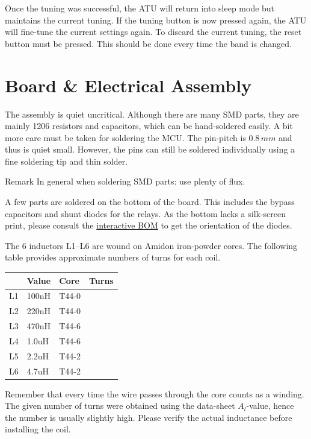 \documentclass[10pt, a4paper,twoside]{scrartcl}
\newenvironment{remark}{\begin{bclogo}[couleur=blue!30,arrondi=.1,logo=\bcinfo,ombre=true]{Remark}}{\end{bclogo}}
\begin{document}
Once the tuning was successful, the ATU will return into sleep mode but maintains the current tuning. If the tuning button is now pressed again, the ATU will fine-tune the current settings again. To discard the current tuning, the reset button must be pressed. This should be done every time the band is changed.

\section{Board \& Electrical Assembly}
The assembly is quiet uncritical. Although there are many SMD parts, they are mainly 1206 resistors and capacitors, which can be hand-soldered easily. A bit more care must be taken for soldering the MCU. The pin-pitch is $0.8\,mm$ and thus is quiet small. However, the pins can still be soldered individually using a fine soldering tip and thin solder. 

\begin{remark}
In general when soldering SMD parts: use plenty of flux. 
\end{remark}

A few parts are soldered on the bottom of the board. This includes the bypass capacitors and shunt diodes for the relays. As the bottom lacks a silk-screen print, please consult the \href{https://dm3mat.darc.de/atu/ATU-ibom.html}{interactive BOM} to get the orientation of the diodes.

The 6 inductors L1--L6 are wound on Amidon iron-powder cores. The following table provides approximate numbers of turns for each coil. 

\begin{center}
\begin{tabular}{|l|l|l|l|} \hline
    & Value & Core  & Turns \\ \hline 
 L1 & 100nH & T44-0 &  \\ 
 L2 & 220nH & T44-0 &  \\ 
 L3 & 470nH & T44-6 &  \\ 
 L4 & 1.0uH & T44-6 &  \\ 
 L5 & 2.2uH & T44-2 &  \\ 
 L6 & 4.7uH & T44-2 &  \\ \hline
\end{tabular}
\end{center}

Remember that every time the wire passes through the core counts as a winding. The given number of turns were obtained using the data-sheet $A_l$-value, hence the number is usually slightly high. Please verify the actual inductance before installing the coil.
\end{document}
